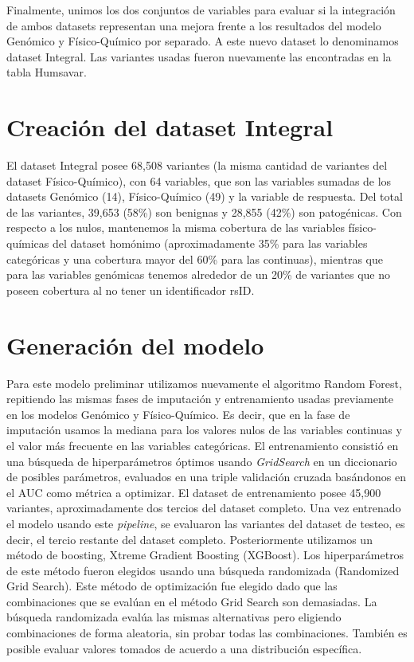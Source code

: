 
Finalmente, unimos los dos conjuntos de variables para evaluar si la integración de ambos datasets representan una mejora frente a los resultados del modelo Genómico y Físico-Químico por separado. A este nuevo dataset lo denominamos dataset Integral. Las variantes usadas fueron nuevamente las encontradas en la tabla Humsavar. 

\section{Creación del dataset Integral}

El dataset Integral posee 68,508 variantes (la misma cantidad de variantes del dataset Físico-Químico), con 64 variables, que son las variables sumadas de los datasets Genómico (14), Físico-Químico (49) y la variable de respuesta. Del total de las variantes, 39,653 (58\%) son benignas y 28,855 (42\%) son patogénicas. Con respecto a los nulos, mantenemos la misma cobertura de las variables físico-químicas del dataset homónimo (aproximadamente 35\% para las variables categóricas y una cobertura mayor del 60\% para las continuas), mientras que para las variables genómicas tenemos alrededor de un 20\% de variantes que no poseen cobertura al no tener un identificador rsID.

\section{Generación del modelo}

Para este modelo preliminar utilizamos nuevamente el algoritmo Random Forest, repitiendo las mismas fases de imputación y entrenamiento usadas previamente en los modelos Genómico y Físico-Químico. Es decir, que en la fase de imputación usamos la mediana para los valores nulos de las variables continuas y el valor más frecuente en las variables categóricas. El entrenamiento consistió en una búsqueda de hiperparámetros óptimos usando \textit{GridSearch} en un diccionario de posibles parámetros, evaluados en una triple validación cruzada basándonos en el AUC como métrica a optimizar. El dataset de entrenamiento posee 45,900 variantes, aproximadamente dos tercios del dataset completo. Una vez entrenado el modelo usando este \textit{pipeline}, se evaluaron las variantes del dataset de testeo, es decir, el tercio restante del dataset completo. Posteriormente utilizamos un método de boosting, Xtreme Gradient Boosting (XGBoost). Los hiperparámetros de este método fueron elegidos usando una búsqueda randomizada (Randomized Grid Search). Este método de optimización fue elegido dado que las combinaciones que se evalúan en el método Grid Search son demasiadas. La búsqueda randomizada evalúa las mismas alternativas pero eligiendo combinaciones de forma aleatoria, sin probar todas las combinaciones. También es posible evaluar valores tomados de acuerdo a una distribución específica.

